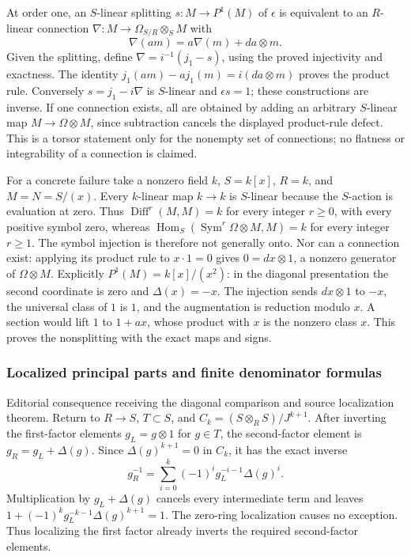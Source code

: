 At order one, an \(S\)-linear splitting \(s:M\to P^1(M)\) of \(\epsilon\) is equivalent to an \(R\)-linear connection \(\nabla:M\to\Omega_{S/R}\otimes_SM\) with \[
\nabla(am)=a\nabla(m)+da\otimes m.
\] Given the splitting, define \(\nabla=i^{-1}(j_1-s)\), using the proved injectivity and exactness. The identity \(j_1(am)-a j_1(m)=i(da\otimes m)\) proves the product rule. Conversely \(s=j_1-i\nabla\) is \(S\)-linear and \(\epsilon s=1\); these constructions are inverse. If one connection exists, all are obtained by adding an arbitrary \(S\)-linear map \(M\to\Omega\otimes M\), since subtraction cancels the displayed product-rule defect. This is a torsor statement only for the nonempty set of connections; no flatness or integrability of a connection is claimed.

For a concrete failure take a nonzero field \(k\), \(S=k[x]\), \(R=k\), and \(M=N=S/(x)\). Every \(k\)-linear map \(k\to k\) is \(S\)-linear because the \(S\)-action is evaluation at zero. Thus \(\operatorname{Diff}^r(M,M)=k\) for every integer \(r\ge0\), with every positive symbol zero, whereas \(\operatorname{Hom}_S(\operatorname{Sym}^r\Omega\otimes M,M)=k\) for every integer \(r\ge1\). The symbol injection is therefore not generally onto. Nor can a connection exist: applying its product rule to \(x\cdot1=0\) gives \(0=dx\otimes1\), a nonzero generator of \(\Omega\otimes M\). Explicitly \(P^1(M)=k[x]/(x^2)\): in the diagonal presentation the second coordinate is zero and \(\Delta(x)=-x\). The injection sends \(dx\otimes1\) to \(-x\), the universal class of \(1\) is \(1\), and the augmentation is reduction modulo \(x\). A section would lift \(1\) to \(1+ax\), whose product with \(x\) is the nonzero class \(x\). This proves the nonsplitting with the exact maps and signs.

\subsubsection{Localized principal parts and finite denominator formulas}\label{localized-principal-parts-and-finite-denominator-formulas}

Editorial consequence receiving the diagonal comparison and source localization theorem. Return to \(R\to S\), \(T\subset S\), and \(C_k=(S\otimes_RS)/J^{k+1}\). After inverting the first-factor elements \(g_L=g\otimes1\) for \(g\in T\), the second-factor element is \(g_R=g_L+\Delta(g)\). Since \(\Delta(g)^{k+1}=0\) in \(C_k\), it has the exact inverse \[
g_R^{-1}=\sum_{i=0}^k(-1)^i g_L^{-i-1}\Delta(g)^i.
\] Multiplication by \(g_L+\Delta(g)\) cancels every intermediate term and leaves \(1+(-1)^kg_L^{-k-1}\Delta(g)^{k+1}=1\). The zero-ring localization causes no exception. Thus localizing the first factor already inverts the required second-factor elements.

